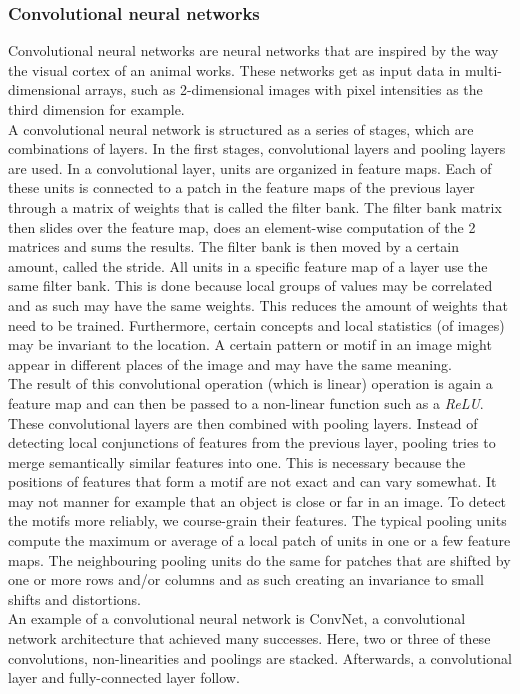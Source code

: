\documentclass[a4paper]{article}
\begin{document}
\subsubsection{Convolutional neural networks}
Convolutional neural networks are neural networks that are inspired by the way the visual cortex of an animal works. These networks get as input data in multi-dimensional arrays, such as 2-dimensional images with pixel intensities as the third dimension for example.\\
A convolutional neural network is structured as a series of stages, which are combinations of layers. In the first stages, convolutional layers and pooling layers are used.
In a convolutional layer, units are organized in feature maps. Each of these units is connected to a patch in the feature maps of the previous layer through a matrix of weights that is called the filter bank. The filter bank matrix then slides over the feature map, does an element-wise computation of the 2 matrices and sums the results. The filter bank is then moved by a certain amount, called the stride. All units in a specific feature map of a layer use the same filter bank.
This is done because local groups of values may be correlated and as such may have the same weights. This reduces the amount of weights that need to be trained. Furthermore, certain concepts and local statistics (of images) may be invariant to the location. A certain pattern or motif in an image might appear in different places of the image and may have the same meaning.\\
The result of this convolutional operation (which is linear) operation is again a feature map and can then be passed to a non-linear function such as a \textit{ReLU}.\\

These convolutional layers are then combined with pooling layers. Instead of detecting local conjunctions of features from the previous layer, pooling tries to merge semantically similar features into one. This is necessary because the positions of features that form a motif are not exact and can vary somewhat. It may not manner for example that an object is close or far in an image. To detect the motifs more reliably, we course-grain their features. The typical pooling units compute the maximum or average of a local patch of units in one or a few feature maps. The neighbouring pooling units do the same for patches that are shifted by one or more rows and/or columns and as such creating an invariance to small shifts and distortions.\\
An example of a convolutional neural network is ConvNet, a convolutional network architecture that achieved many successes. Here, two or three of these convolutions, non-linearities and poolings are stacked. Afterwards, a convolutional layer and fully-connected layer follow.\\
\end{document}
